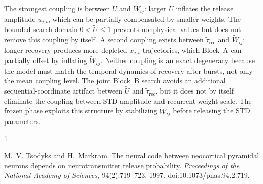 \documentclass[11pt]{article}
\begin{document}
The strongest coupling is between $\tilde{U}$ and $\tilde{W}_{ij}$: larger
$\tilde{U}$ inflates the release amplitude $u_{j,t}$, which can be partially
compensated by smaller weights. The bounded search domain $0<\tilde{U}\leq1$
prevents nonphysical values but does not remove this coupling by itself.
A second coupling exists between $\tilde{\tau}_\text{rec}$ and $\tilde{W}_{ij}$:
longer recovery produces more depleted $x_{j,t}$ trajectories, which Block~A
can partially offset by inflating $\tilde{W}_{ij}$. Neither coupling is an
exact degeneracy because the model must match the temporal dynamics of recovery
after bursts, not only the mean coupling level. The joint Block~B search avoids
an additional sequential-coordinate artifact between $\tilde{U}$ and
$\tilde{\tau}_\text{rec}$, but it does not by itself eliminate the coupling
between STD amplitude and recurrent weight scale. The frozen phase exploits
this structure by stabilizing $\tilde{W}_{ij}$ before releasing the STD
parameters.
\begin{thebibliography}{1}

M.~V. Tsodyks and H.~Markram.
\newblock The neural code between neocortical pyramidal neurons depends on
  neurotransmitter release probability.
\newblock \emph{Proceedings of the National Academy of Sciences}, 94(2):719--723,
  1997.
\newblock doi:{10.1073/pnas.94.2.719}.

\end{thebibliography}
\end{document}
